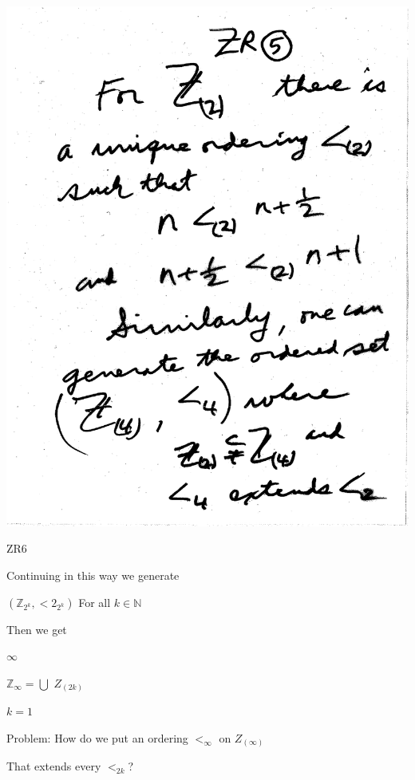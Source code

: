 \documentclass[10pt,a4paper]{article}
\begin{document}
{{\includegraphics[scale=0.5]{Pages/ZR_5}


ZR6

 
Continuing in this way we generate 

$(\mathbb{Z}_{2^k},<2_{2^k})$ For all $k\in\mathbb{N}$
                     


Then we get 

\quad\quad\quad$\infty$
           
$\mathbb{Z}_{\infty} = \bigcup$ $Z_{(2k)}$ 

  \quad\quad $k=1$

Problem: How do we put an ordering $<_{\infty}$ on $Z_{(\infty)}$ 

That extends every $<_{2k}$?

}}
\end{document}
